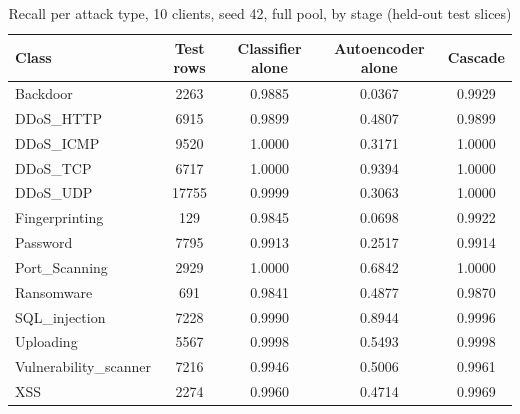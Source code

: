 \begin{table}[H]
\centering
\scriptsize
\setlength{\tabcolsep}{3pt}
\renewcommand{\arraystretch}{1.15}
\begin{tabular}{|l|c|c|c|c|}
\hline
\textbf{Class} & \textbf{Test rows} & \textbf{Classifier alone} & \textbf{Autoencoder alone} & \textbf{Cascade} \\ \hline
Backdoor & 2263 & 0.9885 & 0.0367 & 0.9929 \\ \hline
DDoS\_HTTP & 6915 & 0.9899 & 0.4807 & 0.9899 \\ \hline
DDoS\_ICMP & 9520 & 1.0000 & 0.3171 & 1.0000 \\ \hline
DDoS\_TCP & 6717 & 1.0000 & 0.9394 & 1.0000 \\ \hline
DDoS\_UDP & 17755 & 0.9999 & 0.3063 & 1.0000 \\ \hline
Fingerprinting & 129 & 0.9845 & 0.0698 & 0.9922 \\ \hline
Password & 7795 & 0.9913 & 0.2517 & 0.9914 \\ \hline
Port\_Scanning & 2929 & 1.0000 & 0.6842 & 1.0000 \\ \hline
Ransomware & 691 & 0.9841 & 0.4877 & 0.9870 \\ \hline
SQL\_injection & 7228 & 0.9990 & 0.8944 & 0.9996 \\ \hline
Uploading & 5567 & 0.9998 & 0.5493 & 0.9998 \\ \hline
Vulnerability\_scanner & 7216 & 0.9946 & 0.5006 & 0.9961 \\ \hline
XSS & 2274 & 0.9960 & 0.4714 & 0.9969 \\ \hline
\end{tabular}
\caption{Recall per attack type, 10 clients, seed 42, full pool, by stage (held-out test slices)}
\label{tab:full_per_class}
\end{table}

